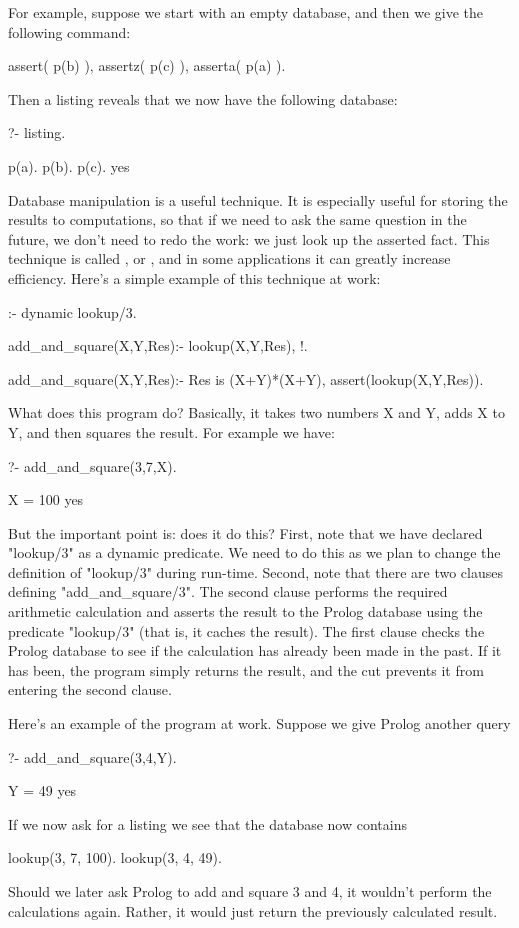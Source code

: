 For example, suppose we start with an empty database, and then
we give the following command:
\begin{LPNcodedisplay}
assert( p(b) ), assertz( p(c) ), asserta( p(a) ).
\end{LPNcodedisplay}
Then a listing reveals that we now have the following
database:
\begin{LPNcodedisplay}
?- listing.

p(a).
p(b).
p(c).
yes
\end{LPNcodedisplay}

Database manipulation is a useful technique.  It is especially useful
for storing the results to computations, so that if we need to ask the
same question in the future, we don't need to redo the work: we just look
up the asserted fact. This technique is called , or
, and in some applications it can greatly increase
efficiency. Here's a simple example of this  technique at work:

\begin{LPNcodedisplay}
:- dynamic lookup/3.

add_and_square(X,Y,Res):-
   lookup(X,Y,Res), !.

add_and_square(X,Y,Res):-
   Res is (X+Y)*(X+Y),
   assert(lookup(X,Y,Res)).
\end{LPNcodedisplay}

What does this program do?  Basically, it takes two numbers X and Y,
adds X to Y, and then squares the result. For example we have:

\begin{LPNcodedisplay}
?- add_and_square(3,7,X).

X = 100
yes
\end{LPNcodedisplay}

But the important point is:  does it do this?  First,
note that we have declared "lookup/3" as a dynamic predicate.  We need
to do this as we plan to change the definition of "lookup/3"
during run-time.  Second, note that there are two clauses defining
"add_and_square/3". The second clause performs the required arithmetic
calculation and asserts the result to the Prolog database using the
predicate "lookup/3" (that is, it  caches the result).  The first
clause checks the Prolog database to see if the calculation has
already been made in the past. If it has been, the program simply
returns the result, and the cut prevents it from entering the second
clause.

Here's an example of the program at work.
Suppose we give Prolog  another query
\begin{LPNcodedisplay}
?-  add_and_square(3,4,Y).

Y = 49
yes
\end{LPNcodedisplay}
If we now ask for a listing we see that the database now contains
\begin{LPNcodedisplay}
lookup(3, 7, 100).
lookup(3, 4, 49).
\end{LPNcodedisplay}
Should we later ask Prolog to add and square 3 and 4, it wouldn't
perform the calculations again. Rather, it would just return the
previously calculated result.

